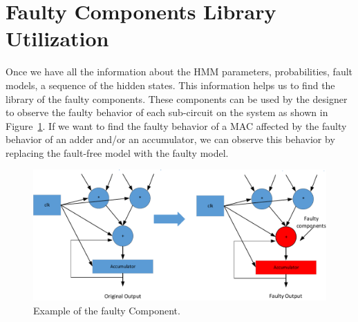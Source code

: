 \section{Faulty Components Library Utilization}
Once we have all the information about the HMM parameters, probabilities, fault models, a sequence of the hidden states. This information helps us to find the library of the faulty components. These components can be used by the designer to observe the faulty behavior of each sub-circuit on the system as shown in Figure~\ref{fig:lib1}.  If we want to find the faulty behavior of a MAC affected by the faulty behavior of an adder and/or an accumulator, we can observe this behavior by replacing the fault-free model with the faulty model.
 
\begin{figure}[tb!]
 \centering
  \captionsetup{justification=centering}    
   \includegraphics[scale=0.6]{Figures/MAC.pdf}
   \caption{Example of the faulty Component.}
\label{fig:lib1}
\end{figure}

